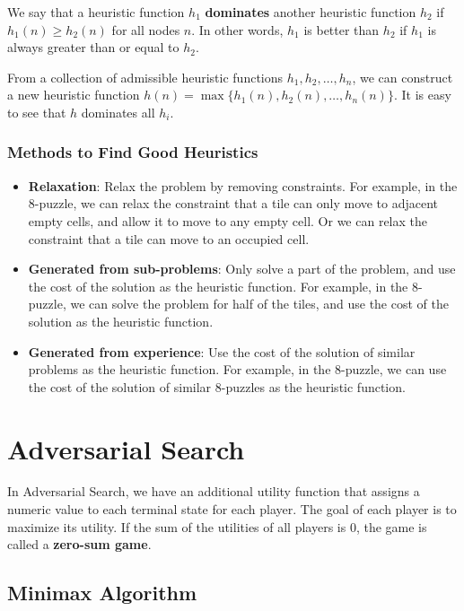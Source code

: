 \documentclass[a4paper,12pt]{article}
\begin{document}
We say that a heuristic function $h_1$ \textbf{dominates} another heuristic function $h_2$ if $h_1(n) \geq h_2(n)$ for all nodes $n$. In other words, $h_1$ is better than $h_2$ if $h_1$ is always greater than or equal to $h_2$.

\begin{tipsbox}
  From a collection of admissible heuristic functions $h_1, h_2, \ldots, h_n$, we can construct a new heuristic function $h(n) = \max\{h_1(n), h_2(n), \ldots, h_n(n)\}$. It is easy to see that $h$ dominates all $h_i$.
\end{tipsbox}

\subsubsection{Methods to Find Good Heuristics}

\begin{itemize}
  \item \textbf{Relaxation}: Relax the problem by removing constraints. For example, in the 8-puzzle, we can relax the constraint that a tile can only move to adjacent empty cells, and allow it to move to any empty cell. Or we can relax the constraint that a tile can move to an occupied cell.
  \item \textbf{Generated from sub-problems}: Only solve a part of the problem, and use the cost of the solution as the heuristic function. For example, in the 8-puzzle, we can solve the problem for half of the tiles, and use the cost of the solution as the heuristic function.
  \item \textbf{Generated from experience}: Use the cost of the solution of similar problems as the heuristic function. For example, in the 8-puzzle, we can use the cost of the solution of similar 8-puzzles as the heuristic function.
\end{itemize}

\section{Adversarial Search}

In Adversarial Search, we have an additional utility function that assigns a numeric value to each terminal state for each player. The goal of each player is to maximize its utility. If the sum of the utilities of all players is 0, the game is called a \textbf{zero-sum game}.

\subsection{Minimax Algorithm}
\end{document}
